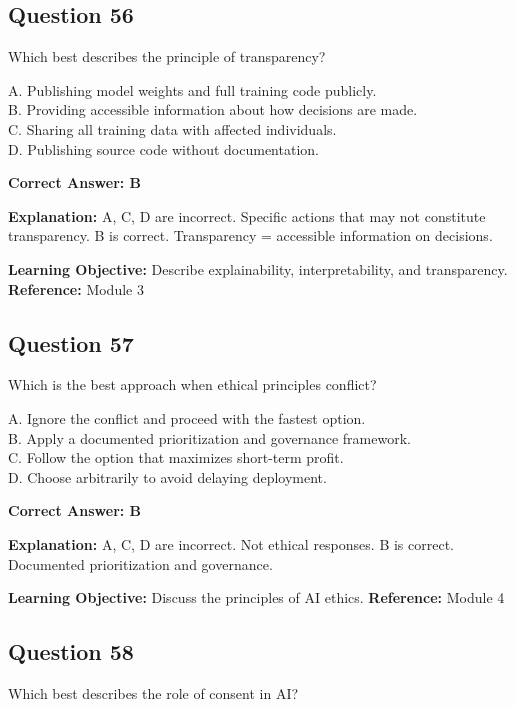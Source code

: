 \documentclass[11pt]{article}
\begin{document}
	\subsection*{Question 56}
	Which best describes the principle of transparency?
	
	A. Publishing model weights and full training code publicly.\\
	B. Providing accessible information about how decisions are made.\\
	C. Sharing all training data with affected individuals.\\
	D. Publishing source code without documentation.
	
	\vspace{0.4em}
	\textbf{Correct Answer: B}
	
	\textbf{Explanation:}
	A, C, D are incorrect. Specific actions that may not constitute
	transparency.
	B is correct. Transparency = accessible information on decisions.
	
	\textbf{Learning Objective:} Describe explainability, interpretability,
	and transparency.
	\textbf{Reference:} Module 3
	
	\subsection*{Question 57}
	Which is the best approach when ethical principles conflict?
	
	A. Ignore the conflict and proceed with the fastest option.\\
	B. Apply a documented prioritization and governance framework.\\
	C. Follow the option that maximizes short-term profit.\\
	D. Choose arbitrarily to avoid delaying deployment.
	
	\vspace{0.4em}
	\textbf{Correct Answer: B}
	
	\textbf{Explanation:}
	A, C, D are incorrect. Not ethical responses.
	B is correct. Documented prioritization and governance.
	
	\textbf{Learning Objective:} Discuss the principles of AI ethics.
	\textbf{Reference:} Module 4
	
	\subsection*{Question 58}
	Which best describes the role of consent in AI?
	
\end{document}
